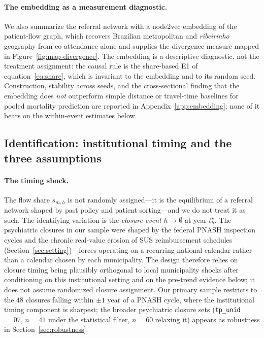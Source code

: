 \paragraph{The embedding as a measurement diagnostic.} We also summarize
the referral network with a node2vec embedding of the patient-flow
graph, which recovers Brazilian metropolitan and \emph{ribeirinho}
geography from co-attendance alone and supplies the divergence measure
mapped in Figure~\ref{fig:map-divergence}. The embedding is a
descriptive diagnostic, not the treatment assignment: the causal rule is
the share-based E1 of equation~\eqref{eq:share}, which is invariant to
the embedding and to its random seed. Construction, stability across
seeds, and the cross-sectional finding that the embedding does
\emph{not} outperform simple distance or travel-time baselines for
pooled mortality prediction are reported in
Appendix~\ref{app:embedding}; none of it bears on the within-event
estimates below.

\subsection{Identification: institutional timing and the three assumptions}
\label{sec:method-identification}

\paragraph{The timing shock.} The flow share $s_{m,h}$ is not
randomly assigned---it is the equilibrium of a referral network shaped
by past policy and patient sorting---and we do not treat it as such. The
identifying variation is the \emph{closure event} $h \to \emptyset$ at
year $t_h^{\star}$. The psychiatric closures in our sample were shaped
by the federal PNASH inspection cycles and the chronic real-value
erosion of SUS reimbursement schedules
(Section~\ref{sec:setting})---forces operating on a recurring national
calendar rather than a calendar chosen by each municipality. The design
therefore relies on closure timing being plausibly orthogonal to local
municipality shocks after conditioning on this institutional setting and
on the pre-trend evidence below; it does not assume randomized closure
assignment.
Our primary sample restricts to the $48$ closures falling within
$\pm 1$ year of a PNASH cycle, where the institutional timing component
is sharpest; the broader psychiatric closure sets
(\texttt{tp\_unid}~$= 07$, $n = 41$ under the statistical filter, $n=60$
relaxing it) appears as robustness in Section~\ref{sec:robustness}.

